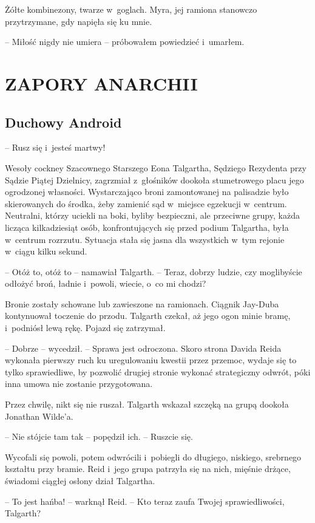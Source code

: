 \documentclass[oneside,polish,11pt,sfheadings]{mwbk}
\begin{document}
Żółte kombinezony, twarze w~goglach. Myra, jej ramiona stanowczo
przytrzymane, gdy napięła się ku mnie.

-- Miłość nigdy nie umiera -- próbowałem powiedzieć i~umarłem.

\part{ZAPORY ANARCHII}
\chapter{Duchowy Android}

-- Rusz się i~jesteś martwy!

Wesoły cockney Szacownego Starszego Eona Talgartha, Sędziego Rezydenta
przy Sądzie Piątej Dzielnicy, zagrzmiał z~głośników dookoła stumetrowego
placu jego ogrodzonej własności. Wystarczająco broni zamontowanej na
palisadzie było skierowanych do środka, żeby zamienić sąd w~miejsce
egzekucji w~centrum. Neutralni, którzy uciekli na boki, byliby
bezpieczni, ale przeciwne grupy, każda licząca kilkadziesiąt osób,
konfrontujących się przed podium Talgartha, była w~centrum rozrzutu.
Sytuacja stała się jasna dla wszystkich w~tym rejonie w~ciągu kilku
sekund.

-- Otóż to, otóż to -- namawiał Talgarth. -- Teraz, dobrzy ludzie, czy
moglibyście odłożyć broń, ładnie i~powoli, wiecie, o~co mi chodzi?

Bronie zostały schowane lub zawieszone na ramionach. Ciągnik Jay-Duba
kontynuował toczenie do przodu. Talgarth czekał, aż jego ogon minie
bramę, i~podniósł lewą rękę. Pojazd się zatrzymał.

-- Dobrze -- wycedził. -- Sprawa jest odroczona. Skoro strona Davida Reida
wykonała pierwszy ruch ku uregulowaniu kwestii przez przemoc, wydaje się
to tylko sprawiedliwe, by pozwolić drugiej stronie wykonać strategiczny
odwrót, póki inna umowa nie zostanie przygotowana.

Przez chwilę, nikt się nie ruszał. Talgarth wskazał szczęką na grupą
dookoła Jonathan Wilde'a.

-- Nie stójcie tam tak -- popędził ich. -- Ruszcie się.

Wycofali się powoli, potem odwrócili i~pobiegli do długiego, niskiego,
srebrnego kształtu przy bramie. Reid i~jego grupa patrzyła się na nich,
mięśnie drżące, świadomi ciągłej osłony dział Talgartha.

-- To jest hańba! -- warknął Reid. -- Kto teraz zaufa Twojej
sprawiedliwości, Talgarth?
\end{document}
